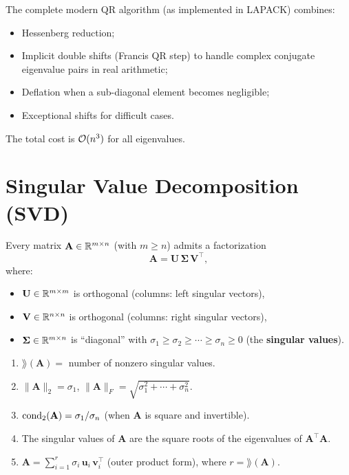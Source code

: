 \begin{remark}
The complete modern QR algorithm (as implemented in LAPACK) combines:
\begin{itemize}
    \item Hessenberg reduction;
    \item Implicit double shifts (Francis QR step) to handle complex conjugate eigenvalue pairs in real arithmetic;
    \item Deflation when a sub-diagonal element becomes negligible;
    \item Exceptional shifts for difficult cases.
\end{itemize}
The total cost is $\mathcal{O}(n^3)$ for all eigenvalues.
\end{remark}

\section{Singular Value Decomposition (SVD)}

\begin{theorem}
\label{thm:svd}
Every matrix $\mathbf{A} \in \mathbb{R}^{m \times n}$ (with $m \geq n$) admits a factorization
\[
    \mathbf{A} = \mathbf{U}\,\boldsymbol{\Sigma}\,\mathbf{V}^\top,
\]
where:
\begin{itemize}
    \item $\mathbf{U} \in \mathbb{R}^{m \times m}$ is orthogonal (columns: left singular vectors),
    \item $\mathbf{V} \in \mathbb{R}^{n \times n}$ is orthogonal (columns: right singular vectors),
    \item $\boldsymbol{\Sigma} \in \mathbb{R}^{m \times n}$ is ``diagonal'' with $\sigma_1 \geq \sigma_2 \geq \cdots \geq \sigma_n \geq 0$ (the \textbf{singular values}).
\end{itemize}
\end{theorem}

\begin{proposition}
\label{prop:svd-properties}
\begin{enumerate}
    \item $\rang(\mathbf{A}) = $ number of nonzero singular values.
    \item $\|\mathbf{A}\|_2 = \sigma_1$, \quad $\|\mathbf{A}\|_F = \sqrt{\sigma_1^2 + \cdots + \sigma_n^2}$.
    \item $\mathrm{cond}_2(\mathbf{A}) = \sigma_1 / \sigma_n$ (when $\mathbf{A}$ is square and invertible).
    \item The singular values of $\mathbf{A}$ are the square roots of the eigenvalues of $\mathbf{A}^\top\mathbf{A}$.
    \item $\mathbf{A} = \sum_{i=1}^{r} \sigma_i\,\mathbf{u}_i\,\mathbf{v}_i^\top$ (outer product form), where $r = \rang(\mathbf{A})$.
\end{enumerate}
\end{proposition}

